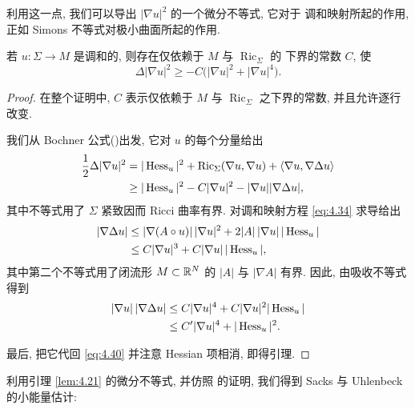 利用这一点, 我们可以导出 $|\nabla u|^2$ 的一个微分不等式, 它对于
调和映射所起的作用, 正如 Simons 不等式对极小曲面所起的作用.

\begin{lemma}
\label{lem:4.21}
若 $u:\Sigma\to M$ 是调和的, 则存在仅依赖于 $M$ 与 $\operatorname{Ric}_{\Sigma}$ 的
下界的常数 $C$, 使
\begin{equation}
\Delta|\nabla u|^2\geq-C\bigl(|\nabla u|^2+|\nabla u|^4\bigr).
\label{eq:4.39}
\end{equation}
\end{lemma}

\begin{proof}
在整个证明中, $C$ 表示仅依赖于 $M$ 与 $\operatorname{Ric}_{\Sigma}$ 之下界的常数,
并且允许逐行改变.

我们从 Bochner 公式()出发, 它对 $u$ 的每个分量给出
\begin{equation}
\begin{aligned}
\frac12\Delta|\nabla u|^2
&=|\operatorname{Hess}_u|^2+\operatorname{Ric}_{\Sigma}(\nabla u,\nabla u)
 +\langle\nabla u,\nabla\Delta u\rangle\\
&\geq|\operatorname{Hess}_u|^2-C|\nabla u|^2-|\nabla u||\nabla\Delta u|,
\end{aligned}
\label{eq:4.40}
\end{equation}
其中不等式用了 $\Sigma$ 紧致因而 Ricci 曲率有界. 对调和映射方程
\eqref{eq:4.34} 求导给出
\begin{equation}
\begin{aligned}
|\nabla\Delta u|
&\leq|\nabla(A\circ u)|\,|\nabla u|^2
 +2|A|\,|\nabla u|\,|\operatorname{Hess}_u|\\
&\leq C|\nabla u|^3+C|\nabla u|\,|\operatorname{Hess}_u|,
\end{aligned}
\label{eq:4.41}
\end{equation}
其中第二个不等式用了闭流形 $M\subset\mathbb{R}^N$ 的 $|A|$ 与 $|\nabla A|$
有界. 因此, 由吸收不等式得到
\begin{equation}
\begin{aligned}
|\nabla u|\,|\nabla\Delta u|
&\leq C|\nabla u|^4+C|\nabla u|^2|\operatorname{Hess}_u|\\
&\leq C'|\nabla u|^4+|\operatorname{Hess}_u|^2.
\end{aligned}
\label{eq:4.42}
\end{equation}

最后, 把它代回 \eqref{eq:4.40} 并注意 Hessian 项相消, 即得引理.
\end{proof}

利用引理 \ref{lem:4.21} 的微分不等式, 并仿照 的证明, 我们得到
Sacks 与 Uhlenbeck \cite{SaUh} 的小能量估计:

